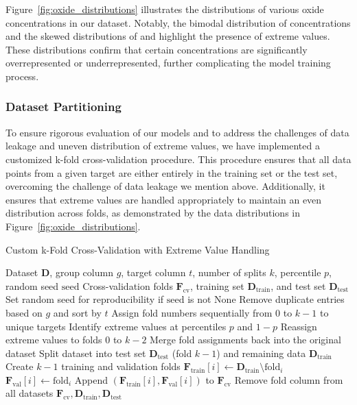 Figure~\ref{fig:oxide_distributions} illustrates the distributions of various oxide concentrations in our dataset.
Notably, the bimodal distribution of  concentrations and the skewed distributions of  and  highlight the presence of extreme values.
These distributions confirm that certain concentrations are significantly overrepresented or underrepresented, further complicating the model training process.


\subsubsection{Dataset Partitioning}\label{subsubsec:dataset_partitioning}
To ensure rigorous evaluation of our models and to address the challenges of data leakage and uneven distribution of extreme values, we have implemented a customized k-fold cross-validation procedure.
This procedure ensures that all data points from a given target are either entirely in the training set or the test set, overcoming the challenge of data leakage we mention above.
Additionally, it ensures that extreme values are handled appropriately to maintain an even distribution across folds, as demonstrated by the data distributions in Figure~\ref{fig:oxide_distributions}.

\begin{algorithm}
\caption{Custom k-Fold Cross-Validation with Extreme Value Handling}
\begin{algorithmic}[1]
\Require Dataset \( \mathbf{D} \), group column \( g \), target column \( t \), number of splits \( k \), percentile \( p \), random seed \( \text{seed} \)
\Ensure Cross-validation folds \( \mathbf{F}_\text{cv} \), training set \( \mathbf{D}_\text{train} \), and test set \( \mathbf{D}_\text{test} \)
\State \label{line:seed} Set random seed for reproducibility if \(\text{seed} \) is not None
\State \label{line:remove_duplicates} Remove duplicate entries based on \( g \) and sort by \( t \)
\State \label{line:assign_folds} Assign fold numbers sequentially from 0 to \( k-1 \) to unique targets
    \State \label{line:identify_extremes} Identify extreme values at percentiles \( p \) and \( 1-p \)
    \State \label{line:reassign_extremes} Reassign extreme values to folds \( 0 \) to \( k-2 \)
\EndIf
\State \label{line:merge_folds} Merge fold assignments back into the original dataset
\State \label{line:split_dataset} Split dataset into test set \( \mathbf{D}_\text{test} \) (fold \( k-1 \)) and remaining data \( \mathbf{D}_\text{train} \)
\State \label{line:create_folds} Create \( k-1 \) training and validation folds
    \State \( \mathbf{F}_\text{train}[i] \gets \mathbf{D}_\text{train} \setminus \text{fold}_i \)
    \State \( \mathbf{F}_\text{val}[i] \gets \text{fold}_i \)
    \State Append \((\mathbf{F}_\text{train}[i], \mathbf{F}_\text{val}[i])\) to \(\mathbf{F}_\text{cv}\)
\EndFor
\State \label{line:remove_fold_column} Remove fold column from all datasets
\State \Return \( \mathbf{F}_\text{cv}, \mathbf{D}_\text{train}, \mathbf{D}_\text{test} \)
\end{algorithmic}
\end{algorithm}

